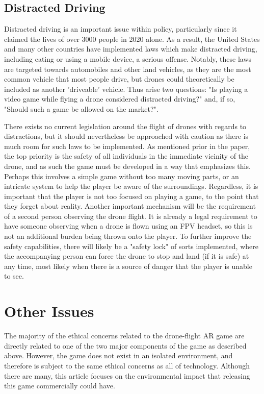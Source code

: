 \documentclass[10pt,twocolumn]{article}
\begin{document}
\subsection{Distracted Driving}

Distracted driving is an important issue within policy, particularly since it claimed the lives of over 3000 people in 2020 alone\cite{DistractedDrivingNHTSA}. As a result, the United States and many other countries have implemented laws which make distracted driving, including eating or using a mobile device, a serious offense. Notably, these laws are targeted towards automobiles and other land vehicles, as they are the most common vehicle that most people drive, but drones could theoretically be included as another 'driveable' vehicle. Thus arise two questions: "Is playing a video game while flying a drone considered distracted driving?" and, if so, "Should such a game be allowed on the market?".

There exists no current legislation around the flight of drones with regards to distractions, but it should nevertheless be approached with caution as there is much room for such laws to be implemented. As mentioned prior in the paper, the top priority is the safety of all individuals in the immediate vicinity of the drone, and as such the game must be developed in a way that emphasizes this. Perhaps this involves a simple game without too many moving parts, or an intricate system to help the player be aware of the surroundings. Regardless, it is important that the player is not too focused on playing a game, to the point that they forget about reality. Another important mechanism will be the requirement of a second person observing the drone flight. It is already a legal requirement to have someone observing when a drone is flown using an FPV headset, so this is not an additional burden being thrown onto the player. To further improve the safety capabilities, there will likely be a "safety lock" of sorts implemented, where the accompanying person can force the drone to stop and land (if it is safe) at any time, most likely when there is a source of danger that the player is unable to see.


\section{Other Issues}
The majority of the ethical concerns related to the drone-flight AR game are directly related to one of the two major components of the game as described above. However, the game does not exist in an isolated environment, and therefore is subject to the same ethical concerns as all of technology. Although there are many, this article focuses on the environmental impact that releasing this game commercially could have.
\end{document}
